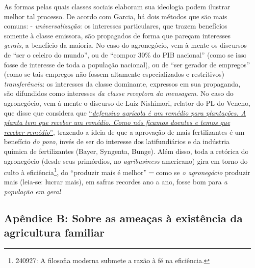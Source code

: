\documentclass[12pt]{article}
\numberwithin{equation}{section}
\theoremstyle{plain}
\theoremstyle{definition}
\theoremstyle{remark}
\begin{document}
As formas pelas quais classes sociais elaboram sua ideologia podem ilustrar melhor tal processo. De acordo com Garcia, há dois métodos que são mais comuns: - \textit{universalização}: os interesses particulares, que trazem benefícios somente à classe emissora, são propagados de forma que pareçam interesses \textit{gerais}, a benefício da maioria. No caso do agronegócio, vem à mente os discursos de ``ser o celeiro do mundo'', ou de ``compor 30\% do PIB nacional'' (como se isso fosse de interesse de toda a população nacional), ou de ``ser gerador de empregos'' (como se tais empregos não fossem altamente especializados e restritivos) - \textit{transferência}: os interesses da classe dominante, expressos em sua propaganda, são difundidos como interesses \textit{da classe receptora da mensagem}. No caso do agronegócio, vem à mente o discurso de Luiz Nishimori, relator do PL do Veneno, que disse que considera que \href{https://ojoioeotrigo.com.br/2018/05/agrotoxico-e-remedio/}{``\textit{defensivo agrícola é um remédio para plantações. A planta tem que receber um remédio. Como nós ficamos doentes e temos que receber remédio}''}, trazendo a ideia de que a aprovação de mais fertilizantes é um benefício \textit{do povo}, invés de ser do interesse dos latifundiários e da indústria química de fertilizantes (Bayer, Syngenta, Bunge). Além disso, toda a retórica do agronegócio (desde seus primórdios, no \textit{agribusiness} americano) gira em torno do culto à eficiência\footnote{240927: A filosofia moderna submete a razão à fé na eficiência.}, do ``produzir mais é melhor'' ─ como se \textit{o agronegócio} produzir mais (leia-se: lucrar mais), em safras recordes ano a ano, fosse bom para \textit{a população em geral}

\hypertarget{apuxeandice-b-sobre-as-ameauxe7as-uxe0-existuxeancia-da-agricultura-familiar}{%
\subsection{Apêndice B: Sobre as ameaças à existência da agricultura familiar}\label{apuxeandice-b-sobre-as-ameauxe7as-uxe0-existuxeancia-da-agricultura-familiar}}
\end{document}
